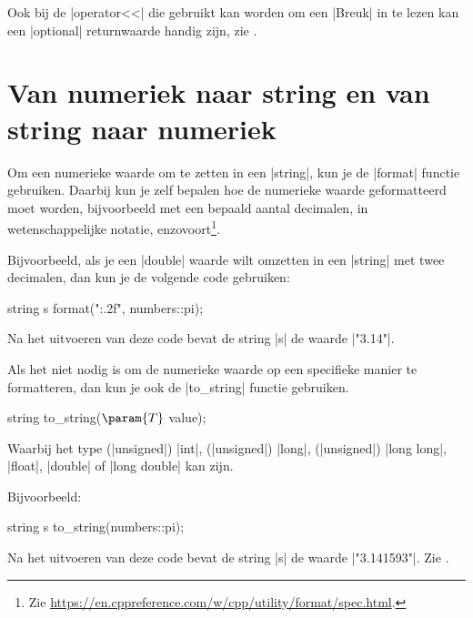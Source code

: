 \begin{cpplstShortInline}
Ook bij de |operator<<| die gebruikt kan worden om een |Breuk| in te lezen kan een |optional| returnwaarde handig zijn, zie .


\section{Van numeriek naar string en van string naar numeriek}
Om een numerieke waarde om te zetten in een |string|, kun je de |format| functie gebruiken.
Daarbij kun je zelf bepalen hoe de numerieke waarde geformatteerd moet worden, bijvoorbeeld met een bepaald aantal decimalen, in wetenschappelijke notatie, enzovoort\footnote{%
	Zie \url{https://en.cppreference.com/w/cpp/utility/format/spec.html}.
}.

Bijvoorbeeld, als je een |double| waarde wilt omzetten in een |string| met twee decimalen, dan kun je de volgende code gebruiken:
\begin{cpplstfragment}
	string s {format("{:.2f}", numbers::pi)};
\end{cpplstfragment}
Na het uitvoeren van deze code bevat de string |s| de waarde |"3.14"|.

Als het niet nodig is om de numerieke waarde op een specifieke manier te formatteren, dan kun je ook de |to_string| functie gebruiken.
\begin{cpplstfragment}[mathescape=true]
string to_string($\param{T}$ value);
\end{cpplstfragment}
Waarbij het type  (|unsigned|) |int|, (|unsigned|) |long|, (|unsigned|) |long long|, |float|, |double| of |long double| kan zijn.

Bijvoorbeeld:
\begin{cpplstfragment}
    string s {to_string(numbers::pi)};
\end{cpplstfragment}
Na het uitvoeren van deze code bevat de string |s| de waarde |"3.141593"|.
Zie .


\end{cpplstShortInline}
